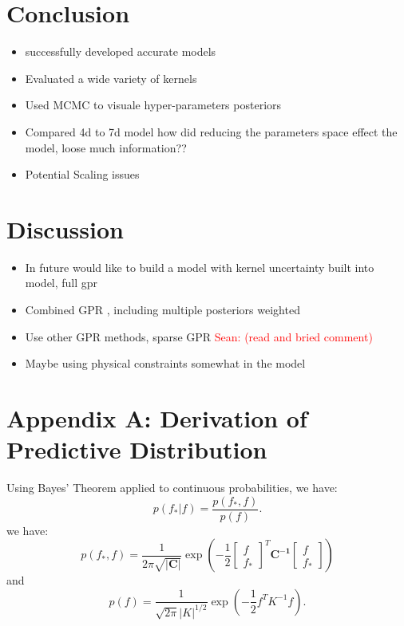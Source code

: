 \documentclass[11pt]{article}
\newcommand{\Sean}[1]{{\textcolor{red}{{Sean: #1}} }}
\begin{document}
\section{Conclusion}
\begin{itemize}
    \item successfully developed accurate models
    \item Evaluated a wide variety of kernels
    \item Used MCMC to visuale hyper-parameters posteriors
    \item Compared 4d to 7d model how did reducing the parameters space effect the model, loose much information??
    \item Potential Scaling issues
\end{itemize}


\section{Discussion}
\begin{itemize}
    \item In future would like to build a model with kernel uncertainty built into model, full gpr
    \item Combined GPR , including multiple posteriors weighted
    \item Use other GPR methods, sparse GPR \Sean{(read and bried comment)}
    \item Maybe using physical constraints somewhat in the model
\end{itemize}

\appendix

\section{Appendix A: Derivation of Predictive Distribution}
\label{appendix:A}
Using Bayes' Theorem applied to continuous probabilities, we have:
\[
p(f_* | f) = \frac{p(f_*, f)}{p(f)}.
\]
we have:
$$p(f_*,f) = \frac{1}{2\pi\sqrt{\mathbf{|C|}}}\exp \left(-\frac{1}{2} 
\begin{bmatrix} f \\ f_*  \end{bmatrix}^T\mathbf{C^{-1}}\begin{bmatrix} f  \\ f_* \end{bmatrix}\right)$$
and 
\[
p(f) = \frac{1}{\sqrt{2\pi} |K|^{1/2}}
\exp \left(-\frac{1}{2} f^T K^{-1} f \right).
\]
\end{document}
